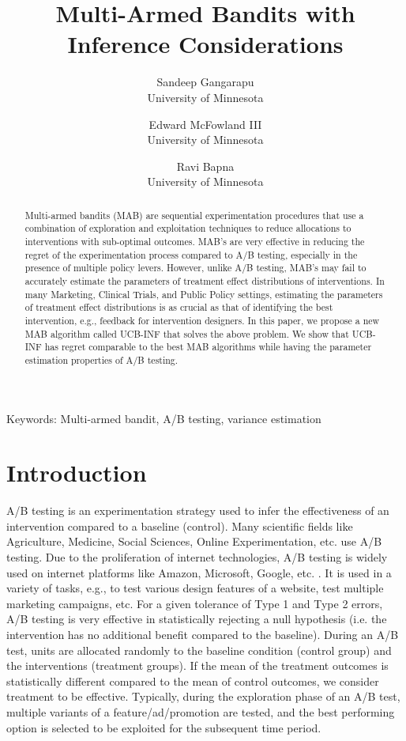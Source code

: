 \documentclass[12pt, letterpaper]{article}
\title{Multi-Armed Bandits with Inference Considerations}
\date{}
\author{Sandeep Gangarapu \\University of Minnesota \and Edward McFowland III \\University of Minnesota \and Ravi Bapna \\University of Minnesota}
\begin{document}
\maketitle
 
\begin{abstract}
Multi-armed bandits (MAB) are sequential experimentation procedures that use a combination of exploration and exploitation techniques to reduce allocations to interventions with sub-optimal outcomes. MAB's are very effective in reducing the regret of the experimentation process compared to A/B testing, especially in the presence of multiple policy levers. However, unlike A/B testing, MAB's may fail to accurately estimate the parameters of treatment effect distributions of interventions. In many Marketing, Clinical Trials, and Public Policy settings, estimating the parameters of treatment effect distributions is as crucial as that of identifying the best intervention, e.g., feedback for intervention designers. In this paper, we propose a new MAB algorithm called UCB-INF that solves the above problem. We show that UCB-INF has regret comparable to the best MAB algorithms while having the parameter estimation properties of A/B testing. 
\end{abstract}

{Keywords: Multi-armed bandit, A/B testing, variance estimation}

\section*{Introduction}
A/B testing is an experimentation strategy used to infer the effectiveness of an intervention compared to a baseline (control). Many scientific fields like Agriculture, Medicine, Social Sciences, Online Experimentation, etc. use A/B testing. Due to the proliferation of internet technologies, A/B testing is widely used on internet platforms like Amazon, Microsoft, Google, etc. \citep{kohavi2009controlled}. It is used in a variety of tasks, e.g., to test various design features of a website, test multiple marketing campaigns, etc. For a given tolerance of Type 1 and Type 2 errors, A/B testing is very effective in statistically rejecting a null hypothesis (i.e. the intervention has no additional benefit compared to the baseline). During an A/B test, units are allocated randomly to the baseline condition (control group) and the interventions (treatment groups). If the mean of the treatment outcomes is statistically different compared to the mean of control outcomes, we consider treatment to be effective.  Typically, during the exploration phase of an A/B test, multiple variants of a feature/ad/promotion are tested, and the best performing option is selected to be exploited for the subsequent time period.
\end{document}
